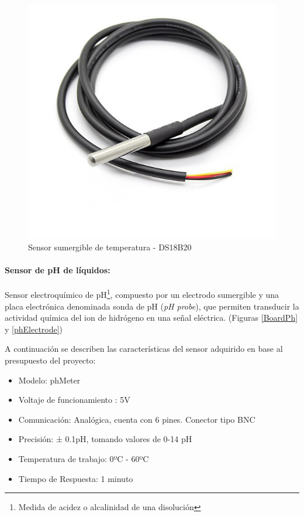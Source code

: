                 \begin{figure} [h]
                    \centering
                    \includegraphics[scale=0.35]{hardware/ds18b20.jpg}
                    \caption{Sensor sumergible de temperatura - DS18B20}
                    \label{SensorTemp}
                \end{figure}
                
            \paragraph{Sensor de pH de líquidos:}Sensor electroquímico de pH\footnote{ Medida de acidez o alcalinidad de una disolución}, compuesto por un electrodo sumergible y una placa electrónica denominada sonda de pH (\textit{pH probe}), que permiten transducir la actividad química del ion de hidrógeno en una señal eléctrica. (Figuras \ref{BoardPh} y \ref{phElectrode})
                
                \par A continuación se describen las características del sensor adquirido en base al presupuesto del proyecto:
                
                \begin{itemize}
                    \item Modelo: phMeter
                    \item Voltaje de funcionamiento : 5V
                    \item Comunicación: Analógica, cuenta con 6 pines. Conector tipo BNC
                    \item Precisión: ± 0.1pH, tomando valores de 0-14 pH
                    \item Temperatura de trabajo: 0ºC - 60ºC
                    \item Tiempo de Respuesta: 1 minuto
                \end{itemize}
                
